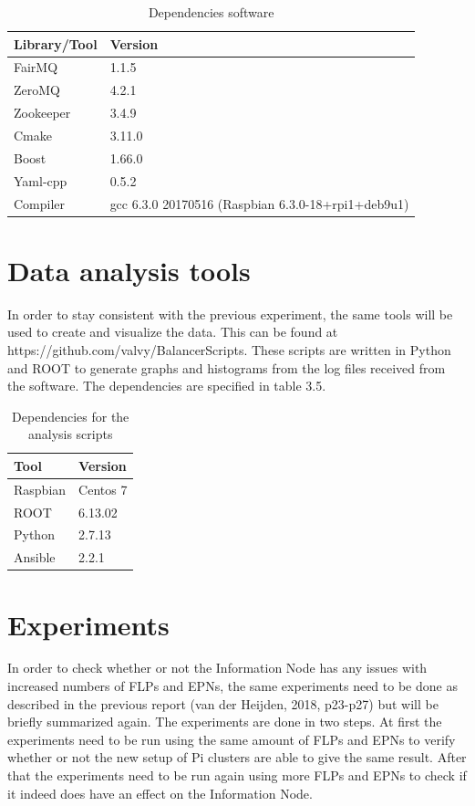 \begin{table}[htb]
\begin{tabular}{| l | l |}
\hline
Library/Tool & Version \\ \hline
FairMQ & 1.1.5\\ \hline
ZeroMQ & 4.2.1\\ \hline
Zookeeper & 3.4.9 \\ \hline
Cmake & 3.11.0 \\ \hline
Boost & 1.66.0 \\ \hline
Yaml-cpp & 0.5.2 \\ \hline
Compiler & gcc 6.3.0 20170516 (Raspbian 6.3.0-18+rpi1+deb9u1)\\ \hline
\end{tabular}
\caption{Dependencies software}
\end{table}

\newpage
\newpage

\section{Data analysis tools}
In order to stay consistent with the previous experiment, the same tools will be used to create and visualize the data. This can be found at \\ https://github.com/valvy/BalancerScripts. These scripts are written in Python and ROOT to generate graphs and histograms from the log files received from the software. The dependencies are specified in table 3.5.

\begin{table}[ht]
\begin{tabular}{| l | l |}
\hline
Tool & Version \\ \hline
Raspbian & Centos 7 \\ \hline
ROOT & 6.13.02 \\ \hline
Python & 2.7.13 \\ \hline
Ansible & 2.2.1 \\ \hline
\end{tabular}
\caption{Dependencies for the analysis scripts}
\end{table}

\newpage

\section{Experiments}
In order to check whether or not the Information Node has any issues with increased numbers of FLPs and EPNs, the same experiments need to be done as described in the previous report (van der Heijden, 2018, p23-p27) but will be briefly summarized again. The experiments are done in two steps. At first the experiments need to be run using the same amount of FLPs and EPNs to verify whether or not the new setup of Pi clusters are able to give the same result. After that the experiments need to be run again using more FLPs and EPNs to check if it indeed does have an effect on the Information Node.


